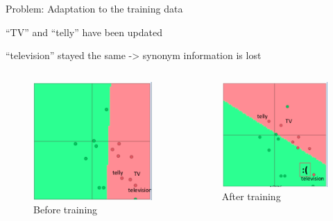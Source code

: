 \documentclass[12pt]{beamer}
\begin{document}
\begin{frame}{Problem: Adaptation to the training data}
	
	“TV” and “telly” have been updated
	
	“television” stayed the same -> synonym information is lost
	
	
	\begin{columns}
		
		\begin{column}{5cm}
			\begin{figure}
				\includegraphics[width=0.8\linewidth]{img/socher1.png}
				\caption{Before training}
			\end{figure}	
			
			
		\end{column}
		\begin{column}{5cm}
			\begin{figure}
				\includegraphics[width=0.8\linewidth]{img/socher2.png}
				\caption{After training}
			\end{figure}	
			
		\end{column}
		
	\end{columns}
	
\end{frame}
\end{document}
